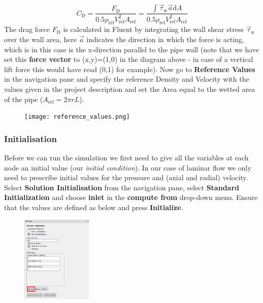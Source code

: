 \documentclass[11pt,a4paper,oneside]{scrartcl}
\newcommand\bfr[1]{\textcolor[rgb]{1,0.00,0.00}{\textbf{\textsf{#1}}}}
\begin{document}
\begin{equation}
    C_\mathrm{D}=\frac{F_\mathrm{D}}{0.5\rho_\mathrm{ref} V_\mathrm{ref}^2 A_\mathrm{ref}}=\frac{\int\vec{\tau}_\mathrm{w}\vec{a}\mathrm{d}A}{0.5\rho_\mathrm{ref} V_\mathrm{ref}^2 A_\mathrm{ref}}
\end{equation}
The drag force $F_\mathrm{D}$ is calculated in Fluent by integrating the  wall shear stress $\vec{\tau}_\mathrm{w}$ over the wall area, here $\vec{a}$ indicates the direction in which the force is acting, which is in this case is the x-direction parallel to the pipe wall (note that we have set this \bfr{force vector} to (x,y)=(1,0) in the diagram above - in case of a vertical lift force this would have read (0,1) for example). Now go to \bfr{Reference Values} in the navigation pane and specify the reference Density and Velocity with the values given in the project description and set the Area equal to the wetted area of the pipe ($A_\mathrm{ref}=2\pi r L$).
\begin{figure}[H]
\begin{center}
\texttt{[image: reference\_values.png]}
\end{center}
\end{figure}
\subsubsection{Initialisation}

Before we can run the simulation we first need to give all the variables at each node an initial value (our \emph{initial condition}). In our case of laminar flow we only need to prescribe initial values for the pressure and (axial and radial) velocity. Select \bfr{Solution Initialisation} from the navigation pane, select \bfr{Standard Initialization} and choose \bfr{inlet} in the \bfr{compute from} drop-down menu. Ensure that the values are defined as below and press \bfr{Initialize}.
\begin{figure}[H]
\begin{center}
\includegraphics[width=0.3\textwidth,clip]{initialization.png}
\end{center}
\end{figure}
\end{document}
